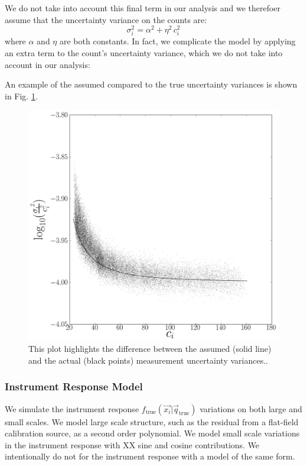 \documentclass[manuscript]{aastex}
\newcommand{\true}{\mathrm{true}}
\begin{document}
We do not take into account this final term in our analysis and we therefoer assume that the uncertainty variance on the counts are:
\begin{displaymath}
\sigma_{{i}}^{2} = \alpha^{2} + \eta^{2}\, c^{2}_i
\end{displaymath}
\noindent{}where $\alpha$ and $\eta$ are both constants. In fact, we complicate the model by applying an extra term to the count's uncertainty variance, which we do not take into account in our analysis: 

An example of the assumed compared to the true uncertainty variances is shown in Fig. \ref{fig:invvar}.

\begin{figure}[ht]
\begin{center}
\includegraphics[width=\textwidth]{invvar.png}
\end{center}
\caption{This plot highlights the difference between the assumed (solid line) and the actual (black points) measurement uncertainty variances.\label{fig:invvar}.}
\end{figure}

\subsubsection{Instrument Response Model}
We simulate the instrument response $f_\true(\vec{x_i} | \vec{q}_{\true})$ variations on both large and small scales. We model large scale structure, such as the residual from a flat-field calibration source, as a second order polynomial. We model small scale variations in the instrument response with XX sine and cosine contributions. We intentionally do not for the instrument response with a model of the same form.
\end{document}
